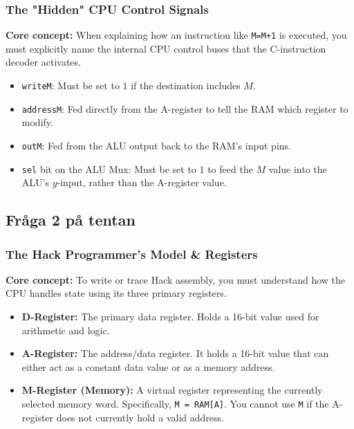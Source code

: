 \documentclass[12pt,a4paper]{article}
\begin{document}
\subsubsection*{The "Hidden" CPU Control Signals}
\textbf{Core concept:} When explaining how an instruction like \texttt{M=M+1} is executed, you must explicitly name the internal CPU control buses that the C-instruction decoder activates.
\begin{itemize}
    \item \texttt{writeM}: Must be set to $1$ if the destination includes $M$.
    \item \texttt{addressM}: Fed directly from the A-register to tell the RAM which register to modify.
    \item \texttt{outM}: Fed from the ALU output back to the RAM's input pins.
    \item \texttt{sel} bit on the ALU Mux: Must be set to $1$ to feed the $M$ value into the ALU's $y$-input, rather than the A-register value.
\end{itemize}

\subsection{Fråga 2 på tentan}
\subsubsection*{The Hack Programmer's Model \& Registers}
\textbf{Core concept:} To write or trace Hack assembly, you must understand how the CPU handles state using its three primary registers.
\begin{itemize}
    \item \textbf{D-Register:} The primary data register. Holds a 16-bit value used for arithmetic and logic.
    \item \textbf{A-Register:} The address/data register. It holds a 16-bit value that can either act as a constant data value or as a memory address.
    \item \textbf{M-Register (Memory):} A virtual register representing the currently selected memory word. Specifically, \texttt{M = RAM[A]}. You cannot use \texttt{M} if the A-register does not currently hold a valid address.
\end{itemize}
\end{document}
